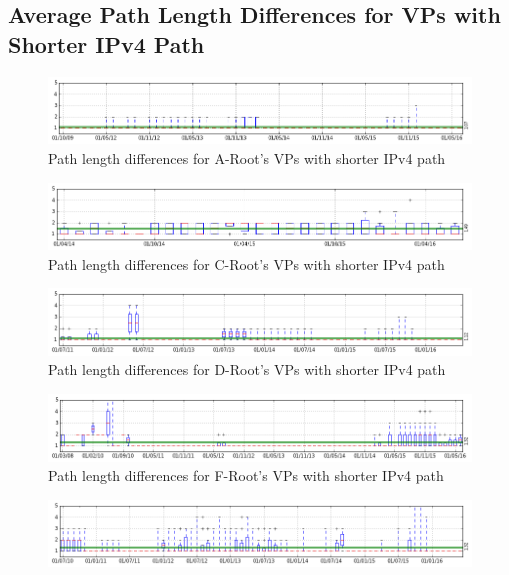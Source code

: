 \begin{appendices}
	
	\chapter{Average Path Length Differences for VPs with Shorter IPv4 Path}
	\label{app:shorter-ipv4}
	\begin{figure}[!htb]
		\centering
		\includegraphics[width=6.0in]{img/shorter-ipv4-a.png}
		\caption{Path length differences for A-Root's VPs with shorter IPv4 path}
		\label{fig:shorter-ipv4-a}
	\end{figure}
	\begin{figure}[!htb]
		\centering
		\includegraphics[width=6.0in]{img/shorter-ipv4-c.png}
		\caption{Path length differences for C-Root's VPs with shorter IPv4 path}
		\label{fig:shorter-ipv4-c}
	\end{figure}
	\begin{figure}[!htb]
		\centering
		\includegraphics[width=6.0in]{img/shorter-ipv4-d.png}
		\caption{Path length differences for D-Root's VPs with shorter IPv4 path}
		\label{fig:shorter-ipv4-d}
	\end{figure}
	\begin{figure}[!htb]
		\centering
		\includegraphics[width=6.0in]{img/shorter-ipv4-f.png}
		\caption{Path length differences for F-Root's VPs with shorter IPv4 path}
		\label{fig:shorter-ipv4-f}
	\end{figure}
	\begin{figure}[!htb]
		\centering
		\includegraphics[width=6.0in]{img/shorter-ipv4-i.png}

\end{figure}
\end{appendices}
